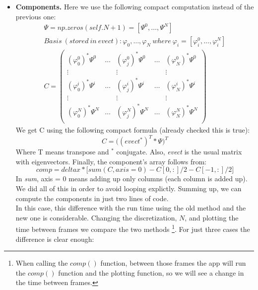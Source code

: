 \documentclass{article}
\begin{document}
\begin{itemize}
\begin{itemize}
		\item \textbf{Components.} Here we use the following compact computation instead of the previous one:
		\[
		\begin{gathered}
		\Psi = np.zeros(self.N + 1) = [\Psi^0, \dots, \Psi^{N}]\\
		Basis\ (stored\ in\ evect): {\varphi_0, \dots, \varphi_N}\    where\   \varphi_i = [\varphi_i^0, \dots, \varphi_i^N]\\
		C = 
		\begin{pmatrix}
		(\varphi_0^0)^*\Psi^0& \dots & (\varphi_j^0)^*\Psi^0 & \dots &  (\varphi_N^0)^*\Psi^0 \\
		\vdots &  & \vdots & & \vdots \\
        (\varphi_0^i)^*\Psi^i & \dots &(\varphi_j^i)^*\Psi^i& \dots & (\varphi_N^i)^*\Psi^i \\
		\vdots &  & \vdots & & \vdots \\
		(\varphi_0^N)^*\Psi^N&\dots &(\varphi_j^N)^*\Psi^N& \dots & (\varphi_N^N)^*\Psi^N \\
		\end{pmatrix}
		\end{gathered}
		\]
		We get C using the following compact formula (already checked this is true):
		\[
		C = \big((evect^*)^T * \Psi \big)^T
		\]
		Where T means transpose and $^*$ conjugate. Also, \textit{evect} is the usual matrix with eigenvectors. Finally, the component's array follows from:
		\[
		comp = deltax * \big[ sum(C, axis=0) - C[0,:]/2 - C[-1,:]/2 \big]
		\]
		In \textit{sum}, axis = 0 means adding up only columns (each column is added up).\\
		We did all of this in order to avoid looping explictly. Summing up, we can compute the components in just two lines of code.\\
		In this case, this difference with the run time using the old method and the new one is considerable. Changing the discretization, $N$, and plotting the time between frames we compare the two methods \footnote{When calling the $comp()$ function, between those frames the app will run the $comp()$ function and the plotting function, so we will see a change in the time between frames.}. For just three cases the difference is clear enough:

\end{itemize}
\end{itemize}
\end{document}
